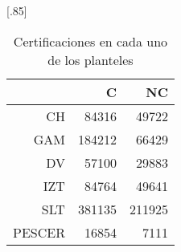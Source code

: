 \documentclass[12pt]{article}
\begin{document}
\begin{table}[ht!]
\centering
\scalebox{0.75}[.85]{
\begin{tabular}{rrr}
  \hline
 & C & NC \\ 
  \hline
CH & 84316 & 49722 \\ 
  GAM & 184212 & 66429 \\ 
  DV & 57100 & 29883 \\ 
  IZT & 84764 & 49641 \\ 
  SLT & 381135 & 211925 \\ 
  PESCER & 16854 & 7111 \\ 
   \hline
\end{tabular}}
\caption{\label{Prob_Cert_Plantel}Certificaciones en cada uno de los planteles}
\end{table}
\end{document}
